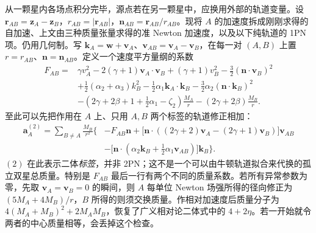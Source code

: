 从一颗星内各场点积分完毕，源点若在另一颗星中，应换用外部的轨道变量。设 $\bm r_{AB}=\bm z_A-\bm z_B$，$r_{AB}=|\bm r_{AB}|$，$\bm n_{AB}=\bm r_{AB}/r_{AB}$。现将 $A$ 的加速度拆成刚刚求得的自加速、上文由三种质量张量求得的准 Newton 加速度，以及以下纯轨道的 1PN 项。仍用几何制。写 $\bm k_A=\bm w+\bm v_A$、$\bm v_{AB}=\bm v_A-\bm v_B$，在每一对 $(A,B)$ 上置 $r=r_{AB}$、$\bm n=\bm n_{AB}$。定义一个速度平方量纲的系数
\begin{align*}
 F_{AB}={}&\gamma v_A^2-2(\gamma+1)\bm v_A\cdot\bm v_B
          +(\gamma+1)v_B^2-\tfrac32(\bm n\cdot\bm v_B)^2\\
 &+\tfrac12(\alpha_2+\alpha_3) k_B^2
          -\tfrac12\alpha_1\bm k_A\cdot\bm k_B
          -\tfrac32\alpha_2(\bm n\cdot\bm k_B)^2\\
 &-(2\gamma+2\beta+1+\tfrac12\alpha_1-\zeta_2)\frac{M_A}{r}
          -(2\gamma+2\beta)\frac{M_B}{r}.
\end{align*}
至此可以先把作用在 $A$ 上、只用 $A,B$ 两个标签的轨道修正相加：
\begin{align*}
 \bm a_A^{(2)}=\sum_{B\ne A}\frac{M_B}{r^2}\bigg\{
   &-F_{AB}\bm n+
      \big[\bm n\cdot((2\gamma+2)\bm v_A-(2\gamma+1)\bm v_B)\big]\bm v_{AB}\\
   &-\big[\bm n\cdot(\alpha_2\bm k_B+\tfrac12\alpha_1\bm v_{AB})\big]\bm k_B\bigg\}.
\end{align*}
$(2)$ 在此表示二体\emph{标签}，并非 2PN；这不是一个可以由牛顿轨道拟合来代换的孤立双星总质量。特别是 $F_{AB}$ 最后一行有两个不同的质量系数。若所有异常参数为零，先取 $\bm v_A=\bm v_B=0$ 的瞬间，则 $A$ 每单位 Newton 场强所得的径向修正为 $(5M_A+4M_B)/r$，$B$ 所得的则须交换质量。作相对加速度后质量分子为 $4(M_A+M_B)^2+2M_AM_B$，恢复了广义相对论二体式中的 $4+2\eta$。若一开始就令两者的中心质量相等，会丢掉这个检查。


